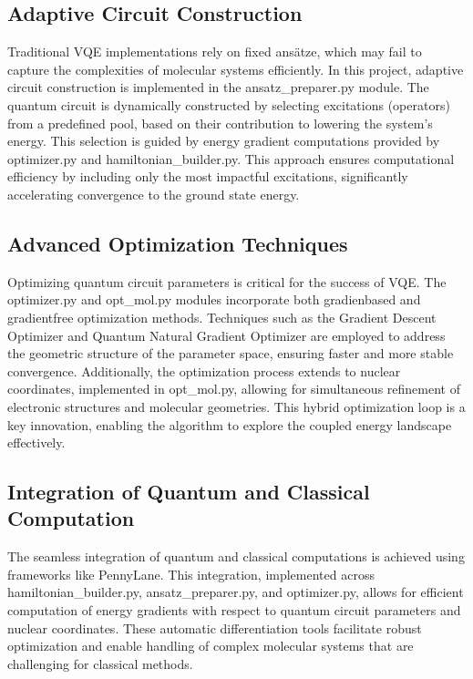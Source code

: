 \subsection*{Adaptive Circuit Construction}

Traditional VQE implementations rely on fixed ansätze, which may fail to capture the complexities of molecular systems efficiently. In this project, adaptive circuit construction is implemented in the ansatz\_preparer.py module. The quantum circuit is dynamically constructed by selecting excitations (operators) from a predefined pool, based on their contribution to lowering the system's energy. This selection is guided by energy gradient computations provided by optimizer.py and hamiltonian\_builder.py. This approach ensures computational efficiency by including only the most impactful excitations, significantly accelerating convergence to the ground state energy.

\subsection*{Advanced Optimization Techniques}

Optimizing quantum circuit parameters is critical for the success of VQE. The optimizer.py and opt\_mol.py modules incorporate both gradien\-based and gradient\-free optimization methods. Techniques such as the Gradient Descent Optimizer and Quantum Natural Gradient Optimizer are employed to address the geometric structure of the parameter space, ensuring faster and more stable convergence. Additionally, the optimization process extends to nuclear coordinates, implemented in opt\_mol.py, allowing for simultaneous refinement of electronic structures and molecular geometries. This hybrid optimization loop is a key innovation, enabling the algorithm to explore the coupled energy landscape effectively.

\subsection*{Integration of Quantum and Classical Computation}

The seamless integration of quantum and classical computations is achieved using frameworks like PennyLane. This integration, implemented across hamiltonian\_builder.py, ansatz\_preparer.py, and optimizer.py, allows for efficient computation of energy gradients with respect to quantum circuit parameters and nuclear coordinates. These automatic differentiation tools facilitate robust optimization and enable handling of complex molecular systems that are challenging for classical methods.

